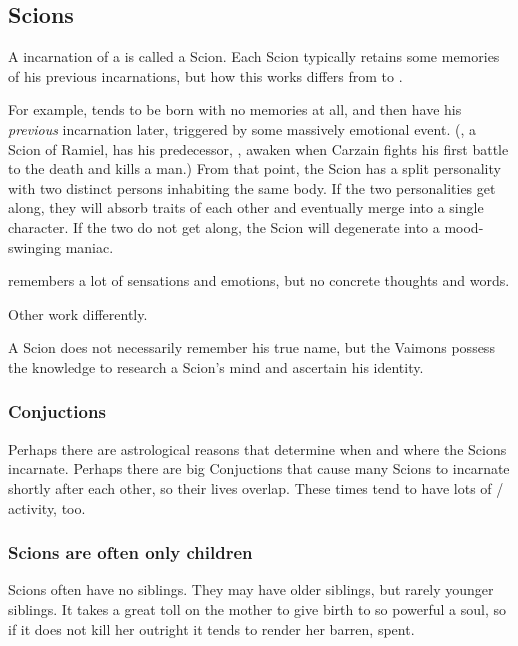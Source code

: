 \subsection{Scions}
A \human{} incarnation of a \Malach{} is called a Scion. 
Each Scion typically retains some memories of his previous incarnations, but how this works differs from \Malach{} to \Malach. 

For example,  tends to be born with no memories at all, and then have his \emph{previous} incarnation  later, triggered by some massively emotional event. (, a Scion of Ramiel, has his predecessor, , awaken when Carzain fights his first battle to the death and kills a man.) 
From that point, the Scion has a split personality with two distinct persons inhabiting the same body. If the two personalities get along, they will absorb traits of each other and eventually merge into a single character. If the two do not get along, the Scion will degenerate into a mood-swinging maniac.

\Shiaraid{} remembers a lot of sensations and emotions, but no concrete thoughts and words. 

Other \Malachim{} work differently. 

A Scion does not necessarily remember his true name, but the Vaimons possess the knowledge to research a Scion's mind and ascertain his \Malach{} identity. 





\subsubsection{Conjuctions}
Perhaps there are astrological reasons that determine when and where the Scions incarnate. 
Perhaps there are big Conjuctions that cause many Scions to incarnate shortly after each other, so their lives overlap. 
These times tend to have lots of \vertex/\matrix{} activity, too. 





\subsubsection{Scions are often only children}
Scions often have no siblings. 
They may have older siblings, but rarely younger siblings. 
It takes a great toll on the mother to give birth to so powerful a soul, so if it does not kill her outright it tends to render her barren, spent. 










